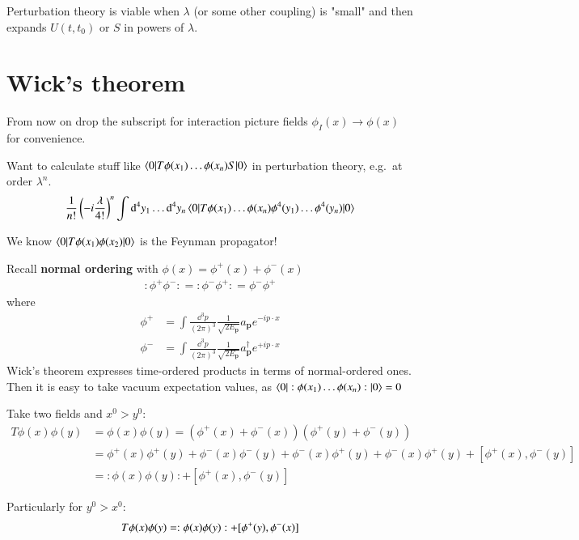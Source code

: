 Perturbation theory is viable when $\lambda$ (or some other coupling) is "small" and then expands $U(t,t_0)$ or $S$ in powers of $\lambda$.

\section{Wick's theorem}
From now on drop the subscript for interaction picture fields $\phi_I(x) \rightarrow \phi(x)$ for convenience.

Want to calculate stuff like $\braket{0 | T\phi(x_1)\dots\phi(x_n)S | 0}$ in perturbation theory, e.g.\ at order $\lambda^n$.  
\begin{align}
\frac{1}{n!} \left( -i\frac{\lambda}{4!} \right)^n \int \dd^4 y_1 \dots \dd^4 y_n \braket{0 | T\phi(x_1)\dots\phi(x_n)\phi^4(y_1)\dots\phi^4(y_n) | 0}
\end{align}

We know $\braket{0 | T\phi(x_1)\phi(x_2) | 0 } $ is the Feynman propagator!

Recall \textbf{normal ordering} with $\phi(x) = \phi^+(x) + \phi^-(x)$
\begin{align}
	:\phi^+ \phi^-: = :\phi^- \phi^+: = \phi^- \phi^+
\end{align} 
where
\begin{align}
\phi^+ &= \int \frac{\dd^3 p}{(2\pi)^3} \frac{1}{\sqrt{2E_{\pmb{p}}}} a_{\pmb{p}} e^{-ip\cdot x} \\
	\phi^- &= \int \frac{\dd^3 p}{(2\pi)^3} \frac{1}{\sqrt{2E_{\pmb{p}}}} a^\dagger_{\pmb{p}} e^{+ip\cdot x}
\end{align}
Wick's theorem expresses time-ordered products in terms of normal-ordered ones. Then it is easy to take vacuum expectation values, as $\braket{0 | :\phi(x_1)\dots\phi(x_n):|0} = 0$

Take two fields and $x^0 > y^0$:
\begin{align*}
	T \phi(x)\phi(y) &= \phi(x)\phi(y) = \left(\phi^+(x)+\phi^-(x)\right)\left(\phi^+(y)+\phi^-(y)\right) \\
	&= \phi^+(x)\phi^+(y) + \phi^-(x)\phi^-(y) + \phi^-(x) \phi^+(y) + \phi^-(x) \phi^+(y) + [\phi^+(x), \phi^-(y)] \\
	&= :\phi(x)\phi(y): + [\phi^+(x),\phi^-(y)]
\end{align*} 

Particularly for $y^0 > x^0$: 
\begin{align}
	T\phi(x)\phi(y) = :\phi(x)\phi(y): + [\phi^+(y),\phi^-(x)] \notag
\end{align}

